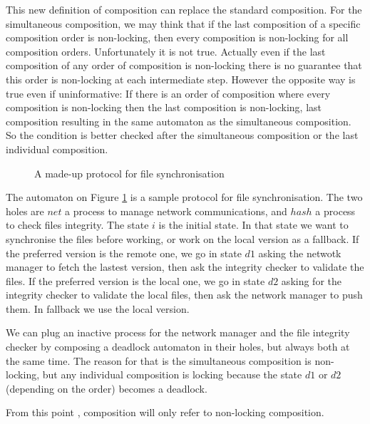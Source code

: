 \documentclass{article}
\begin{document}
This new definition of composition can replace the standard composition.
For the simultaneous composition, we may think that if the last composition of a specific composition order is non-locking, then every composition is non-locking for all composition orders.
Unfortunately it is not true.
Actually even if the last composition of any order of composition is non-locking there is no guarantee that this order is non-locking at each intermediate step.
However the opposite way is true even if uninformative:
If there is an order of composition where every composition is non-locking then the last composition is non-locking, last composition resulting in the same automaton as the simultaneous composition.
So the condition is better checked after the simultaneous composition or the last individual composition.
\begin{exi}
\begin{figure}
\centering

\caption{A made-up protocol for file synchronisation}
\label{fig:pnls}
\end{figure}
The automaton on Figure \ref{fig:pnls} is a sample protocol for file synchronisation.
The two holes are \(net\) a process to manage network communications, and \(hash\) a process to check files integrity.
The state \(i\) is the initial state.
In that state we want to synchronise the files before working, or work on the local version as a fallback.
If the preferred version is the remote one, we go in state \(d1\) asking the netwotk manager to fetch the lastest version, then ask the integrity checker to validate the files.
If the preferred version is the local one, we go in state \(d2\) asking for the integrity checker to validate the local files, then ask the network manager to push them.
In fallback we use the local version.

We can plug an inactive process for the network manager and the file integrity checker by composing a deadlock automaton in their holes, but always both at the same time.
The reason for that is the simultaneous composition is non-locking, but any individual composition is locking because the state \(d1\) or \(d2\) (depending on the order) becomes a deadlock.
\end{exi}
From this point , composition will only refer to non-locking composition.
\end{document}
